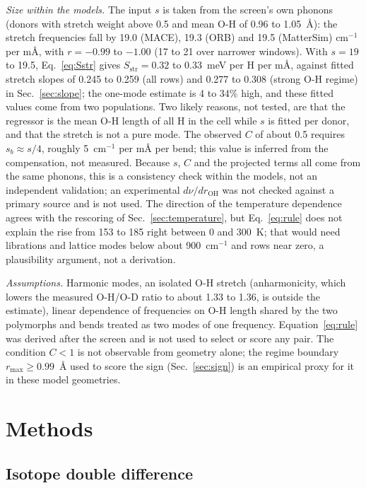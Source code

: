 \documentclass[aps,prmaterials,reprint,superscriptaddress,nofootinbib]{revtex4-2}
\begin{document}
\textit{Size within the models.} The input $s$ is taken from the screen's own phonons (donors with stretch weight above 0.5 and mean O-H of 0.96 to 1.05~\AA): the stretch frequencies fall by 19.0 (MACE), 19.3 (ORB) and 19.5 (MatterSim) cm$^{-1}$ per m\AA, with $r = -0.99$ to $-1.00$ (17 to 21 over narrower windows). With $s = 19$ to 19.5, Eq.~\eqref{eq:Sstr} gives $S_{\mathrm{str}} = 0.32$ to 0.33~meV per H per m\AA, against fitted stretch slopes of 0.245 to 0.259 (all rows) and 0.277 to 0.308 (strong O-H regime) in Sec.~\ref{sec:slope}; the one-mode estimate is 4 to 34\% high, and these fitted values come from two populations. Two likely reasons, not tested, are that the regressor is the mean O-H length of all H in the cell while $s$ is fitted per donor, and that the stretch is not a pure mode. The observed $C$ of about 0.5 requires $s_b \approx s/4$, roughly 5~cm$^{-1}$ per m\AA{} per bend; this value is inferred from the compensation, not measured. Because $s$, $C$ and the projected terms all come from the same phonons, this is a consistency check within the models, not an independent validation; an experimental $d\nu/dr_{\mathrm{OH}}$ was not checked against a primary source and is not used. The direction of the temperature dependence agrees with the rescoring of Sec.~\ref{sec:temperature}, but Eq.~\eqref{eq:rule} does not explain the rise from 153 to 185 right between 0 and 300~K; that would need librations and lattice modes below about 900~cm$^{-1}$ and rows near zero, a plausibility argument, not a derivation.

\textit{Assumptions.} Harmonic modes, an isolated O-H stretch (anharmonicity, which lowers the measured O-H/O-D ratio to about 1.33 to 1.36, is outside the estimate), linear dependence of frequencies on O-H length shared by the two polymorphs and bends treated as two modes of one frequency. Equation~\eqref{eq:rule} was derived after the screen and is not used to select or score any pair. The condition $C<1$ is not observable from geometry alone; the regime boundary $r_{\max}\geq0.99$~\AA{} used to score the sign (Sec.~\ref{sec:sign}) is an empirical proxy for it in these model geometries.

\section{Methods}
\label{sec:methods}

\subsection{Isotope double difference}
\end{document}
